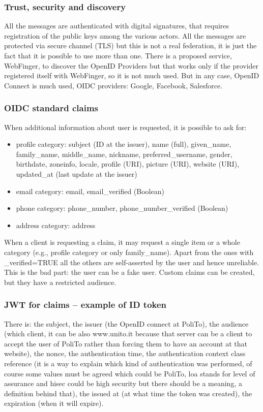 \subsubsection{Trust, security and discovery}
All the messages are authenticated with digital signatures, that
requires registration of the public keys among the various actors. All
the messages are protected via secure channel (TLS) but this is not a
real federation, it is just the fact that it is possible to use more
than one. There is a proposed service, WebFinger, to discover the
OpenID Providers but that works only if the provider registered itself
with WebFinger, so it is not much used. But in any case, OpenID
Connect is much used, OIDC providers: Google, Facebook, Salesforce.

\subsubsection{OIDC standard claims}
When additional information about user is requested, it is possible to
ask for:
\begin{itemize}
  \item profile category: subject (ID at the issuer), name (full),
    given\_name, family\_name, middle\_name, nickname,
    preferred\_username, gender, birthdate, zoneinfo, locale, profile
    (URI), picture (URI), website (URI), updated\_at (last update at the
    issuer)
  \item email category: email, email\_verified (Boolean)
  \item phone category: phone\_number, phone\_number\_verified (Boolean)
  \item address category: address
\end{itemize}
When a client is requesting a claim, it may request a single item or a
whole category (e.g., profile category or only family\_name). Apart
from the ones with \_verified=TRUE all the others are self-asserted by
the user and hence unreliable. This is the bad part: the user can be a
fake user. Custom claims can be created, but they have a restricted
audience.

\subsubsection{JWT for claims – example of ID token}
There is: the subject, the issuer (the OpenID connect at PoliTo), the
audience (which client, it can be also www.unito.it because that
server can be a client to accept the user of PoliTo rather than
forcing them to have an account at that website), the nonce, the
authentication time, the authentication context class reference (it is
a way to explain which kind of authentication was performed, of course
some values must be agreed which could be PoliTo, loa stands for level
of assurance and hisec could be high security but there should be a
meaning, a definition behind that), the issued at (at what time the
token was created), the expiration (when it will expire).

